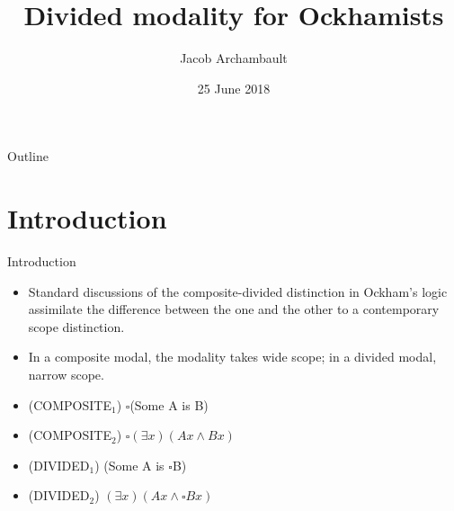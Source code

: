 \documentclass{beamer}
\title[] %
{Divided modality for Ockhamists}
\subtitle
{} %
\author[] %
{Jacob Archambault}
\institute[] %
{Unilog 2018, Vichy}
\date[] %
{25 June 2018}
\begin{document}
	
	\begin{frame}
		\titlepage
	\end{frame}
	
	\begin{frame}{Outline}
		\tableofcontents[pausesections]
	\end{frame}
	
	
	
	
\section{Introduction}
\begin{frame}{Introduction}
	\begin{itemize}
		\item Standard discussions of the composite-divided distinction in Ockham's logic assimilate the difference between the one and the other to a contemporary scope distinction. \pause
		\item In a composite modal, the modality takes wide scope; in a divided modal, narrow scope. \pause 
		\item (COMPOSITE$_{1}$) $\square$(Some A is B)
		\item (COMPOSITE$_{2}$) $\square(\exists x)(Ax \wedge Bx)$
		\item (DIVIDED$_{1}$) (Some A is $\square$B)
		\item (DIVIDED$_{2}$) $(\exists x)(Ax \wedge \square Bx)$
	\end{itemize}
\end{frame}	
\end{document}
